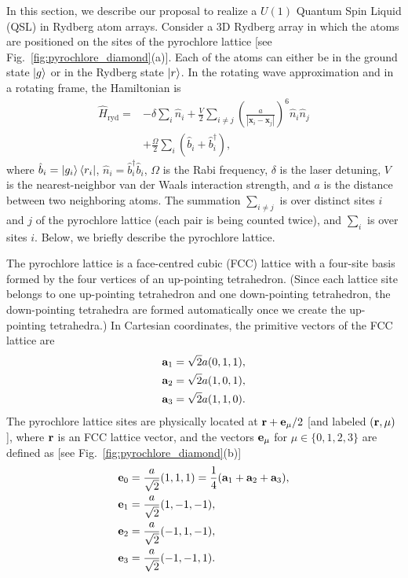 \documentclass[twocolumn,superscriptaddress,amsmath,amssymb,aps,prx,nofootinbib]{revtex4-2}
\begin{document}
In this section, we describe our proposal to realize a $U(1)$ Quantum Spin Liquid (QSL) in Rydberg atom arrays. 
Consider a 3D Rydberg array in which the atoms are positioned on the sites of the pyrochlore lattice [see Fig.~\ref{fig:pyrochlore_diamond}(a)]. Each of the atoms can either be  in the ground state $\ket{g}$ or in the  Rydberg state $\ket{r}$. In the rotating wave approximation and in a rotating frame, the Hamiltonian is
\begin{equation}
\begin{aligned}
  \hat{H}_{\text{ryd}} =& -\delta \sum_i \hat{n}_i + \frac{V}{2} \sum_{i \neq j} \left( \frac{a}{|\bm{x}_i -\bm{x}_j|} \right)^6 \hat{n}_i \hat{n}_j\\
  &+\frac{\Omega}{2} \sum_i (\hat{b}_i + \hat{b}_i^\dagger ),
  \end{aligned}
\end{equation}
where $\hat{b}_i = \ket{g_i}\bra{r_i}$, $\hat{n}_i = \hat{b}_i^\dagger \hat{b}_i$, $\Omega$ is the Rabi frequency, $\delta$ is the laser detuning, $V$ is the nearest-neighbor van der Waals interaction strength,  and $a$ is the distance between two neighboring atoms. The summation $\sum_{i \neq j}$ is over distinct sites $i$ and $j$ of the pyrochlore lattice (each pair is being counted twice), and  $\sum_i$ is over sites $i$. Below, we briefly describe the pyrochlore lattice.

The pyrochlore lattice is a face-centred cubic (FCC) lattice with a four-site basis formed by the four vertices of an up-pointing tetrahedron. (Since each lattice site belongs to one up-pointing tetrahedron and one down-pointing tetrahedron, the down-pointing tetrahedra are formed automatically once we create the up-pointing tetrahedra.) In Cartesian coordinates, the primitive vectors of the FCC lattice are 
\begin{equation}
\begin{aligned}
    \vb{a}_1&=\sqrt{2}a(0,1,1),\\
    \vb{a}_2&=\sqrt{2}a(1,0,1),\\
    \vb{a}_3&=\sqrt{2}a(1,1,0).
\end{aligned}
\end{equation}
The pyrochlore lattice sites are physically located at $\vb{r}+\vb{e}_\mu/2$ [and labeled $(\vb{r},\mu)$], where $\vb{r}$ is an FCC lattice vector, and the vectors $\vb{e}_\mu$ for $\mu \in \{ 0,1,2,3 \}$ are defined as [see Fig.~\ref{fig:pyrochlore_diamond}(b)]
\begin{equation}
\begin{aligned}
    \vb{e}_0&=\frac{a}{\sqrt{2}}(1,1,1) = \frac{1}{4}(\vb{a}_1+\vb{a}_2 + \vb{a}_3),\\
    \vb{e}_1&=\frac{a}{\sqrt{2}}(1,-1,-1),\\
    \vb{e}_2&=\frac{a}{\sqrt{2}}(-1,1,-1),\\
    \vb{e}_3&=\frac{a}{\sqrt{2}}(-1,-1,1).
\end{aligned}
\end{equation}
\end{document}
